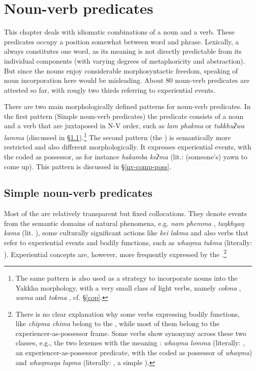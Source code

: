 
\chapter{Noun-verb predicates}\label{noun-verb}

This chapter deals with idiomatic combinations of a noun and a verb. These predicates occupy a position somewhat between word and phrase. Lexically, a  always constitutes one word, as its meaning is not directly predictable from its individual components (with varying degrees of metaphoricity and abstraction). But since the nouns enjoy considerable morphosyntactic freedom, speaking of  noun incorporation here would be misleading. About 80 noun-verb predicates are attested so far, with rougly two thirds referring to experiential events.

There are two main morphologically defined patterns for noun-verb predicates. In the first pattern (Simple noun-verb predicates) the predicate consists of a noun and a verb that are juxtaposed in N-V order, such as \emph{lam phakma}  or \emph{tukkhuʔwa lamma}   (discussed in §\ref{simple-noun-verb}).\footnote{The same pattern is also used as a strategy to incorporate  nouns into the Yakkha morphology, with a very small class of light verbs, namely \emph{cokma} , \emph{wama}  and \emph{tokma} , cf. §\ref{cop}. } The second pattern (the ) is semantically more restricted and also  different morphologically. It expresses experiential events, with the  coded as possessor, as for instance \emph{hakamba keʔma}  (lit.: (someone's) yawn to come up). This pattern is discussed in §\ref{nv-comp-poss}. 

\section{Simple noun-verb predicates}\label{simple-noun-verb}

Most of the  are relatively transparent but fixed collocations. They denote events from the semantic domains of natural phenomena, e.g. \emph{nam phemma} , \emph{taŋkhyaŋ kama}  (lit. ), some culturally significant actions like \emph{kei lakma}  and also verbs that refer to experiential events and bodily functions, such as \emph{whaŋma tukma}  (literally: ). Experiential concepts are, however, more frequently expressed by the .\footnote{There is no clear explanation why some verbs expressing bodily functions, like  \emph{chipma chima}   belong to the , while most of them belong to the experiencer-as-possessor frame. Some verbs show  synonymy across these two classes, e.g., the two lexemes with the meaning  : \emph{whaŋma lomma} (literally: , an experiencer-as-possessor predicate, with the  coded as possessor of \emph{whaŋma}) and \emph{whaŋmaŋa lupma} (literally: , a simple ).} 

